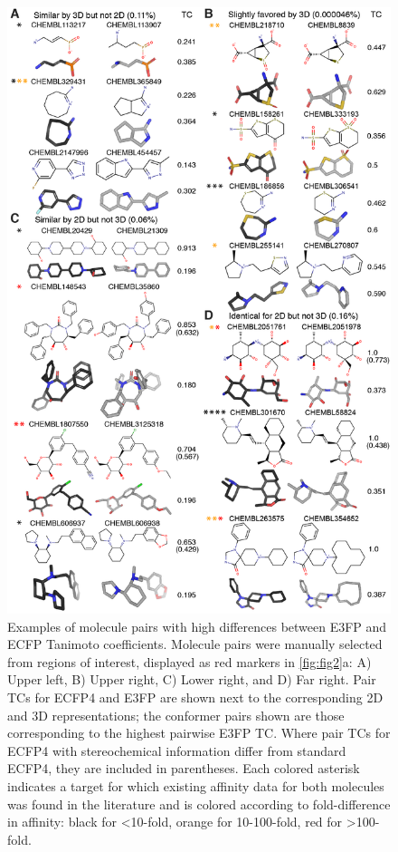 \documentclass[../main.tex]{subfiles}
\begin{document}
\begin{refsection}
\begin{figure}%
    \centering  \includegraphics[height=\dimexpr \textheight - 4\baselineskip\relax]{figures/chapter2/fig3.png}
    \caption[Examples of molecule pairs with high differences between E3FP and ECFP Tanimoto coefficients]{
        Examples of molecule pairs with high differences between E3FP and ECFP Tanimoto coefficients.
        Molecule pairs were manually selected from regions of interest, displayed as red markers in  \cref{fig:fig2}a: A) Upper left, B) Upper right, C) Lower right, and D) Far right.
        Pair TCs for ECFP4 and E3FP are shown next to the corresponding 2D and 3D representations; the conformer pairs shown are those corresponding to the highest pairwise E3FP TC.
        Where pair TCs for ECFP4 with stereochemical information differ from standard ECFP4, they are included in parentheses.
        Each colored asterisk indicates a target for which existing affinity data for both molecules was found in the literature and is colored according to fold-difference in affinity: black for \textless{}10-fold, orange for 10-100-fold, red for  \textgreater{}100-fold.}
    \label{fig:fig3}
\end{figure}


\end{refsection}
\end{document}
